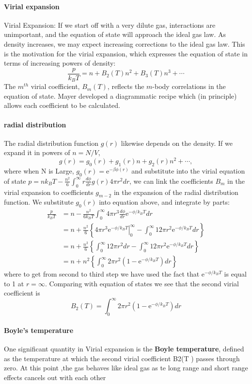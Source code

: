 \documentclass[12pt,a4paper]{article}
\begin{document}
\paragraph*{Virial expansion}Virial Expansion: If we start off with a very dilute gas, interactions are unimportant, and the equation of state will approach the ideal gas law. As density increases, we may expect increasing corrections to the ideal gas law. This is the motivation for the virial expansion, which expresses the equation of state in terms of increasing powers of density:
$$
\frac{p}{k_B T}=n+B_2(T) n^2+B_3(T) n^3+\cdots
$$
The $m^{t h}$ virial coefficient, $B_m(T)$, reflects the $m$-body correlations in the equation of state. Mayer developed a diagrammatic recipe which (in principle) allows each coefficient to be calculated.
\paragraph*{radial distribution}
The radial distribution function $g(r)$ likewise depends on the density. If we expand it in powers of $n=N / V$,
$$
g(r)=g_0(r)+g_1(r) n+g_2(r) n^2+\cdots,
$$
where when N is Large, $g_0(r)=\mathrm{e}^{-\beta \phi(r)}$
and substitute into the virial equation of state 
$p=n k_B T-\frac{n^2}{6} \int_0^{\infty} r \frac{d \phi}{d r} g(r) 4 \pi r^2 d r$, we can link the coefficients $B_m$ in the virial expansion to coefficients $g_{m-2}$ in the expansion of the radial distribution function.
We substitute $g_0(r)$ into equation above, and integrate by parts:
$$
\begin{aligned}
\frac{p}{k_B T} & =n-\frac{n^2}{6 k_B T} \int_0^{\infty} 4 \pi r^3 \frac{d \phi}{d r} \mathrm{e}^{-\phi / k_B T} d r \\
& =n+\frac{n^2}{6}\left\{\left.4 \pi r^3 \mathrm{e}^{-\phi / k_B T}\right|_0 ^{\infty}-\int_0^{\infty} 12 \pi r^2 \mathrm{e}^{-\phi / k_B T} d r\right\} \\
& =n+\frac{n^2}{6}\left\{\int_0^{\infty} 12 \pi r^2 d r-\int_0^{\infty} 12 \pi r^2 \mathrm{e}^{-\phi / k_B T} d r\right\} \\
& =n+n^2\left\{\int_0^{\infty} 2 \pi r^2\left(1-\mathrm{e}^{-\phi / k_B T}\right) d r\right\}
\end{aligned}
$$
where to get from second to third step we have used the fact that $\mathrm{e}^{-\phi / k_B T}$ is equal to 1 at $r=\infty$. Comparing with equation of states we see that the second virial coefficient is
$$
B_2(T)=\int_0^{\infty} 2 \pi r^2\left(1-\mathrm{e}^{-\phi / k_B T}\right) d r
$$
\paragraph{Boyle's temperature}
One significant quantity in Virial expansion is the \textbf{Boyle temperature}, defined as the temperature at which the second virial coefficient B2(T ) passes through zero.
At this point ,the gas behaves like ideal gas as te long range and short range effects cancels out with each other 
\end{document}
